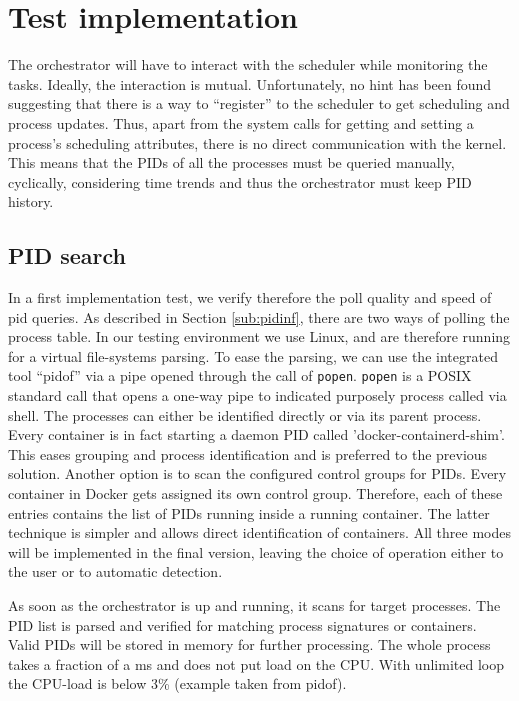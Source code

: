 \documentclass[]{scrartcl}
\begin{document}
\section{Test implementation}
\label{sec:testimp}

The orchestrator will have to interact with the scheduler while monitoring the tasks. 
Ideally, the interaction is mutual. Unfortunately, no hint has been found suggesting that there is a way to ``register'' to the scheduler to get scheduling and process updates. 
Thus, apart from the system calls for getting and setting a process's scheduling attributes, there is no direct communication with the kernel. 
This means that the PIDs of all the processes must be queried manually, cyclically, considering time trends and thus the orchestrator must keep PID history. 

\subsection{PID search}

In a first implementation test, we verify therefore the poll quality and speed of pid queries.
As described in Section \ref{sub:pidinf}, there are two ways of polling the process table. 
In our testing environment we use Linux, and are therefore running for a virtual file-systems parsing. 
To ease the parsing, we can use the integrated tool ``pidof'' via a pipe opened through the call of \texttt{popen}.
\texttt{popen} is a POSIX standard call that opens a one-way pipe to indicated purposely process called via shell.
The processes can either be identified directly or via its parent process. Every container is in fact starting a daemon PID called 'docker-containerd-shim'. This eases grouping and process identification and is preferred to the previous solution.
Another option is to scan the configured control groups for PIDs. Every container in Docker gets assigned its own control group. Therefore, each of these entries contains the list of PIDs running inside a running container. 
The latter technique is simpler and allows direct identification of containers.
All three modes will be implemented in the final version, leaving the choice of operation either to the user or to automatic detection.

As soon as the orchestrator is up and running, it scans for target processes.
The PID list is parsed and verified for matching process signatures or containers.
Valid PIDs will be stored in memory for further processing.
The whole process takes a fraction of a ms and does not put load on the {CPU}. With unlimited loop the {CPU}-load is below 3\% (example taken from pidof).
\end{document}
